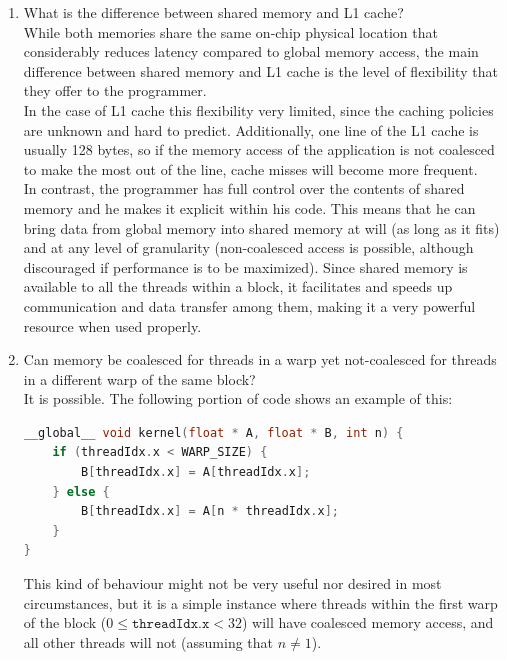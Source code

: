 \documentclass{article}
\begin{document}
\begin{enumerate}[1.]
	\item What is the difference between shared memory and L1 cache?\\
	While both memories share the same on-chip physical location that considerably reduces latency compared to global memory access, the main difference between shared memory and L1 cache is the level of flexibility that they offer to the programmer.\\
	In the case of L1 cache this flexibility very limited, since the caching policies are unknown and hard to predict. Additionally, one line of the L1 cache is usually 128 bytes, so if the memory access of the application is not coalesced to make the most out of the line, cache misses will become more frequent.\\
	In contrast, the programmer has full control over the contents of shared memory and he makes it explicit within his code. This means that he can bring data from global memory into shared memory at will (as long as it fits) and at any level of granularity (non-coalesced access is possible, although discouraged if performance is to be maximized). Since shared memory is available to all the threads within a block, it facilitates and speeds up communication and data transfer among them, making it a very powerful resource when used properly.
	
	\item Can memory be coalesced for threads in a warp yet not-coalesced for threads in a different warp of the same block?\\
	It is possible. The following portion of code shows an example of this:
\begin{lstlisting}[language=C]
__global__ void kernel(float * A, float * B, int n) {
    if (threadIdx.x < WARP_SIZE) {
        B[threadIdx.x] = A[threadIdx.x];
    } else {
        B[threadIdx.x] = A[n * threadIdx.x];
    }
}\end{lstlisting}
    This kind of behaviour might not be very useful nor desired in most circumstances, but it is a simple instance where threads within the first warp of the block ($0 \leq \texttt{threadIdx.x} < 32$) will have coalesced memory access, and all other threads will not (assuming that $n \neq 1$).
	

\end{enumerate}
\end{document}
